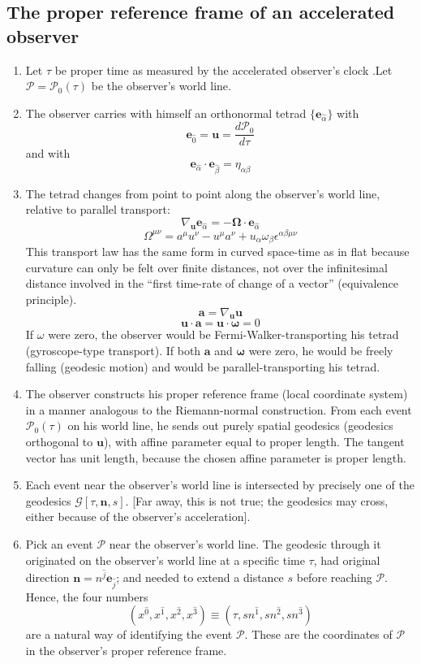 \subsection{The proper reference frame of an accelerated observer}
\begin{enumerate}
\item Let $\tau$ be proper time as measured by the accelerated observer's clock .Let $\mathcal{P} = \mathcal{P}_0(\tau)$ be the observer's world line.
\item The observer carries with himself an orthonormal tetrad $\{\bm{e}_{\hat{\alpha}}\}$
with
\[\bm{e}_{\hat{0}} = \bm{u} = \frac{d \mathcal{P}_0}{d \tau}\]
and with
\[\bm{e}_{\hat{\alpha}} \cdot \bm{e}_{\hat{\beta}} = \eta_{\alpha \beta}\]
\item The tetrad changes from point to point along the observer's world line, relative to parallel transport:
\[\nabla_{\bm{u}} \bm{e}_{\hat{\alpha}} = - \bm{\Omega} \cdot \bm{e}_{\hat{\alpha}} \]
\[\Omega^{\mu \nu} = a^{\mu} u^{\nu} - u^{\mu} a^{\nu} + u_{\alpha} \omega_{\beta}\epsilon^{\alpha \beta \mu \nu}\]
This transport law has the same form in curved space-time as in flat because curvature can only be felt over finite distances, not over
the infinitesimal distance involved in the ``first time-rate of change of a vector'' (equivalence principle).
\[\bm{a} = \nabla_{\bm{u}} \bm{u}\]
\[\bm{u} \cdot \bm{a} = \bm{u} \cdot \bm{\omega} = 0\]
If $\omega$ were zero, the observer would be Fermi-Walker-transporting his tetrad (gyroscope-type transport). If both $\bm{a}$ and $\bm{\omega}$ were zero, he would be freely falling (geodesic motion) and would be parallel-transporting his tetrad.
\item The observer constructs his proper reference frame (local coordinate system) in a manner analogous to the Riemann-normal construction. From each event $\mathcal{P}_0(\tau)$ on his world line, he sends out purely spatial geodesics (geodesics orthogonal to $\bm{u}$), with affine parameter equal to proper length. The tangent vector has unit length, because the chosen affine
parameter is proper length.
\item Each event near the observer's world line is intersected by precisely one of the geodesics $\mathcal{G}[\tau,\bm{n},s]$. [Far away, this is not true; the geodesics may cross, either
because of the observer's acceleration].
\item Pick an event $\mathcal{P}$ near the observer's world line. The geodesic through it originated on the observer's world line at a specific time $\tau$, had original direction $\bm{n} = n^{\hat{j}} \bm{e}_{\hat{j}}$; and needed to extend a distance $s$ before reaching $\mathcal{P}$. Hence, the four numbers
\[(x^{\hat{0}},x^{\hat{1}},x^{\hat{2}},x^{\hat{3}}) \equiv (\tau,s n^{\hat{1}},s n^{\hat{2}},s n^{\hat{3}})\]
are a natural way of identifying the event $\mathcal{P}$. These are the coordinates of $\mathcal{P}$ in the observer's proper reference frame.
\end{enumerate}
